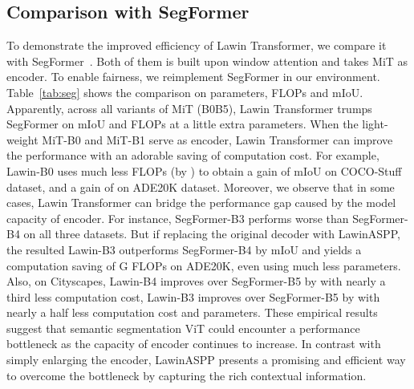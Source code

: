 \documentclass[10pt,twocolumn,letterpaper]{article}
\begin{document}
\subsection{Comparison with SegFormer}
To demonstrate the improved efficiency of Lawin Transformer, we compare it with SegFormer~\cite{xie2021segformer}. Both of them is built upon window attention and takes MiT as encoder. To enable fairness, we reimplement SegFormer in our environment. Table~\ref{tab:seg} shows the comparison on parameters, FLOPs and mIoU. Apparently, across all variants of MiT (B0B5), Lawin Transformer trumps SegFormer on mIoU and FLOPs at a little extra parameters. When the light-weight MiT-B0 and MiT-B1 serve as encoder, Lawin Transformer can improve the performance with an adorable saving of computation cost. For example, Lawin-B0 uses much less FLOPs (by ) to obtain a gain of  mIoU on COCO-Stuff dataset, and a gain of  on ADE20K dataset. Moreover, we observe that in some cases, Lawin Transformer can bridge the performance gap caused by the model capacity of encoder. For instance, SegFormer-B3 performs worse than SegFormer-B4 on all three datasets. But if replacing the original decoder with LawinASPP, the resulted Lawin-B3 outperforms SegFormer-B4 by  mIoU and yields a computation saving of G FLOPs on ADE20K, even using much less parameters. Also, on Cityscapes, Lawin-B4 improves over SegFormer-B5 by  with nearly a third less computation cost, Lawin-B3 improves over SegFormer-B5 by  with nearly a half less computation cost and parameters. These empirical results suggest that semantic segmentation ViT could encounter a performance bottleneck as the capacity of encoder continues to increase. In contrast with simply enlarging the encoder, LawinASPP presents a promising and efficient way to overcome the bottleneck by capturing the rich contextual information.
\end{document}
